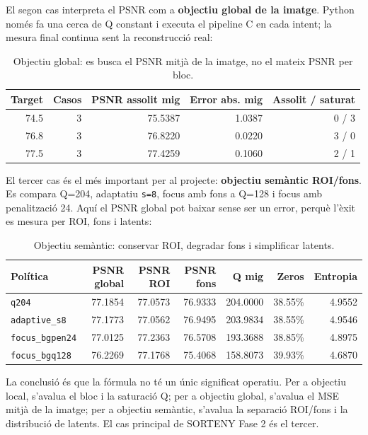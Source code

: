 \documentclass[11pt,a4paper]{article}
\begin{document}
El segon cas interpreta el PSNR com a \textbf{objectiu global de la imatge}. Python només fa una cerca de Q constant i executa el pipeline C en cada intent; la mesura final continua sent la reconstrucció real:

\begin{table}[H]
\centering
\begin{tabular}{rrrrr}
\toprule
\textbf{Target} & \textbf{Casos} & \textbf{PSNR assolit mig} & \textbf{Error abs. mig} & \textbf{Assolit / saturat} \\
\midrule
74.5 & 3 & 75.5387 & 1.0387 & 0 / 3 \\
76.8 & 3 & 76.8220 & 0.0220 & 3 / 0 \\
77.5 & 3 & 77.4259 & 0.1060 & 2 / 1 \\
\bottomrule
\end{tabular}
\caption{Objectiu global: es busca el PSNR mitjà de la imatge, no el mateix PSNR per bloc.}
\end{table}

El tercer cas és el més important per al projecte: \textbf{objectiu semàntic ROI/fons}. Es compara Q=204, adaptatiu \texttt{s=8}, focus amb fons a Q=128 i focus amb penalització 24. Aquí el PSNR global pot baixar sense ser un error, perquè l'èxit es mesura per ROI, fons i latents:

\begin{table}[H]
\centering
\begin{tabular}{lrrrrrr}
\toprule
\textbf{Política} & \textbf{PSNR global} & \textbf{PSNR ROI} & \textbf{PSNR fons} & \textbf{Q mig} & \textbf{Zeros} & \textbf{Entropia} \\
\midrule
\texttt{q204} & 77.1854 & 77.0573 & 76.9333 & 204.0000 & 38.55\% & 4.9552 \\
\texttt{adaptive\_s8} & 77.1773 & 77.0562 & 76.9495 & 203.9834 & 38.55\% & 4.9546 \\
\texttt{focus\_bgpen24} & 77.0125 & 77.2363 & 76.5708 & 193.3688 & 38.85\% & 4.8975 \\
\texttt{focus\_bgq128} & 76.2269 & 77.1768 & 75.4068 & 158.8073 & 39.93\% & 4.6870 \\
\bottomrule
\end{tabular}
\caption{Objectiu semàntic: conservar ROI, degradar fons i simplificar latents.}
\end{table}

La conclusió és que la fórmula no té un únic significat operatiu. Per a objectiu local, s'avalua el bloc i la saturació Q; per a objectiu global, s'avalua el MSE mitjà de la imatge; per a objectiu semàntic, s'avalua la separació ROI/fons i la distribució de latents. El cas principal de SORTENY Fase 2 és el tercer.
\end{document}
